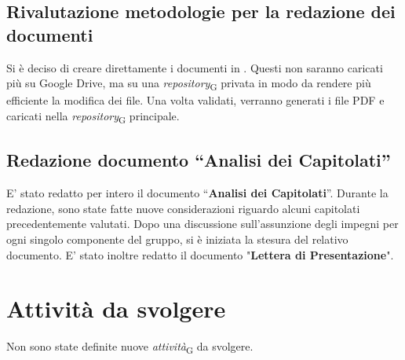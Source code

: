 \documentclass{article}
\begin{document}
    \subsection{Rivalutazione metodologie per la redazione dei documenti}
    Si è deciso di creare direttamente i documenti in \latex. Questi non saranno caricati più su Google Drive, ma su una \textit{repository}\textsubscript{G} privata in modo da rendere più efficiente la modifica dei file. Una volta validati, verranno generati i file PDF e caricati nella \textit{repository}\textsubscript{G} principale.
    \subsection{Redazione documento “Analisi dei Capitolati”}
    E’ stato redatto per intero il documento “\textbf{Analisi dei Capitolati}”. Durante la redazione, sono state fatte nuove considerazioni riguardo alcuni capitolati precedentemente valutati.
    Dopo una discussione sull'assunzione degli impegni per ogni singolo componente del gruppo, si è iniziata la stesura del relativo documento. E' stato inoltre redatto il documento "\textbf{Lettera di Presentazione}". 

\section{Attività da svolgere}
Non sono state definite nuove \textit{attività}\textsubscript{G} da svolgere.
\end{document}
